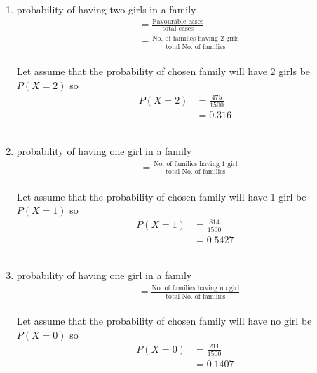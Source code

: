 \renewcommand{\theequation}{\theenumi}
\begin{enumerate}[label=\arabic*.,ref=\thesubsection.\theenumi]
\item probability of having two girls in a family
\begin{align}
&= \frac{\text {Favourable cases} }{\text {total cases}}
\\
&=\frac{\text {No. of families having 2 girls} }{\text {total No. of families}}
\end{align} 
\\
Let assume that the probability of chosen family will have 2 girls  be $P\left(X=2\right)$ so 
\begin{align}
P\left(X=2\right)&= \frac{475}{1500}
\\
&= 0.316
\end{align}
\\
\item probability of having one  girl in a family
\begin{align}
&=\frac{\text {No. of families having 1 girl} }{\text {total No. of families}}
\end{align} 
\\
Let assume that the probability of chosen family will have 1 girl  be $P\left(X=1\right)$ so 
\begin{align}
P\left(X=1\right)&= \frac{814}{1500}
\\
&= 0.5427
\end{align} 
\\
\item probability of having one  girl in a family
\begin{align}
&=\frac{\text {No. of families having no girl} }{\text {total No. of families}}
\end{align} 
\\
Let assume that the probability of chosen family will have no girl  be $P\left(X=0\right)$ so 
\begin{align}
P\left(X=0\right)&= \frac{211}{1500}
\\
&= 0.1407
\end{align} 


\end{enumerate}
